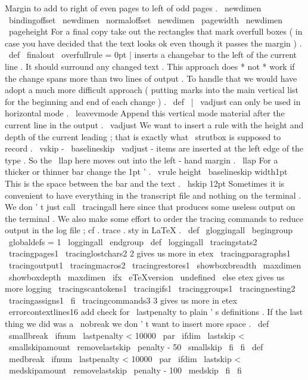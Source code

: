 %
Margin
to
add
to
right
of
even
pages
to
left
of
odd
pages
.
\
newdimen
\
bindingoffset
\
newdimen
\
normaloffset
\
newdimen
\
pagewidth
\
newdimen
\
pageheight
%
For
a
final
copy
take
out
the
rectangles
%
that
mark
overfull
boxes
(
in
case
you
have
decided
%
that
the
text
looks
ok
even
though
it
passes
the
margin
)
.
%
\
def
\
finalout
{
\
overfullrule
=
0pt
}
%
|
inserts
a
changebar
to
the
left
of
the
current
line
.
It
should
%
surround
any
changed
text
.
This
approach
does
*
not
*
work
if
the
%
change
spans
more
than
two
lines
of
output
.
To
handle
that
we
would
%
have
adopt
a
much
more
difficult
approach
(
putting
marks
into
the
main
%
vertical
list
for
the
beginning
and
end
of
each
change
)
.
%
\
def
\
|
{
%
%
\
vadjust
can
only
be
used
in
horizontal
mode
.
\
leavevmode
%
%
Append
this
vertical
mode
material
after
the
current
line
in
the
output
.
\
vadjust
{
%
%
We
want
to
insert
a
rule
with
the
height
and
depth
of
the
current
%
leading
;
that
is
exactly
what
\
strutbox
is
supposed
to
record
.
\
vskip
-
\
baselineskip
%
%
\
vadjust
-
items
are
inserted
at
the
left
edge
of
the
type
.
So
%
the
\
llap
here
moves
out
into
the
left
-
hand
margin
.
\
llap
{
%
%
%
For
a
thicker
or
thinner
bar
change
the
1pt
'
.
\
vrule
height
\
baselineskip
width1pt
%
%
This
is
the
space
between
the
bar
and
the
text
.
\
hskip
12pt
}
%
}
%
}
%
Sometimes
it
is
convenient
to
have
everything
in
the
transcript
file
%
and
nothing
on
the
terminal
.
We
don
'
t
just
call
\
tracingall
here
%
since
that
produces
some
useless
output
on
the
terminal
.
We
also
make
%
some
effort
to
order
the
tracing
commands
to
reduce
output
in
the
log
%
file
;
cf
.
trace
.
sty
in
LaTeX
.
%
\
def
\
gloggingall
{
\
begingroup
\
globaldefs
=
1
\
loggingall
\
endgroup
}
%
\
def
\
loggingall
{
%
\
tracingstats2
\
tracingpages1
\
tracinglostchars2
%
2
gives
us
more
in
etex
\
tracingparagraphs1
\
tracingoutput1
\
tracingmacros2
\
tracingrestores1
\
showboxbreadth
\
maxdimen
\
showboxdepth
\
maxdimen
\
ifx
\
eTeXversion
\
undefined
\
else
%
etex
gives
us
more
logging
\
tracingscantokens1
\
tracingifs1
\
tracinggroups1
\
tracingnesting2
\
tracingassigns1
\
fi
\
tracingcommands3
%
3
gives
us
more
in
etex
\
errorcontextlines16
}
%
%
add
check
for
\
lastpenalty
to
plain
'
s
definitions
.
If
the
last
thing
%
we
did
was
a
\
nobreak
we
don
'
t
want
to
insert
more
space
.
%
\
def
\
smallbreak
{
\
ifnum
\
lastpenalty
<
10000
\
par
\
ifdim
\
lastskip
<
\
smallskipamount
\
removelastskip
\
penalty
-
50
\
smallskip
\
fi
\
fi
}
\
def
\
medbreak
{
\
ifnum
\
lastpenalty
<
10000
\
par
\
ifdim
\
lastskip
<
\
medskipamount
\
removelastskip
\
penalty
-
100
\
medskip
\
fi
\
fi
}

